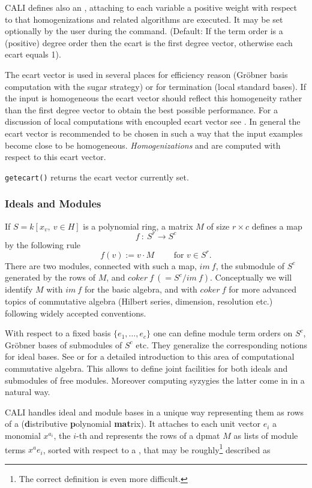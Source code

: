 CALI defines also an , attaching to each variable a
positive weight with respect to that homogenizations and related
algorithms are executed. It may be set optionally by the user during
the  command.  (Default: If the term order is a
(positive) degree order then the ecart is the first degree vector,
otherwise each ecart equals 1).

The ecart vector is used in several places for efficiency reason (Gr\"obner
basis computation with the sugar strategy) or for termination (local
standard bases). If the input is homogeneous the ecart vector should
reflect this homogeneity rather than the first degree vector to
obtain the best possible performance. For a discussion of local
computations with encoupled ecart vector see \cite{tcah}. In general
the ecart vector is recommended to be chosen in such a way that the
input examples become close to be homogeneous. \emph{Homogenizations}
and  are computed with respect to this ecart
vector.
\medskip

\noindent \verb|getecart()| returns the ecart vector
currently set.


\subsubsection{Ideals and Modules}

If $S=k[x_v,\ v \in H]$ is a polynomial ring, a matrix $M$ of size
$r\times c$ defines a map
\[f\ :\ S^r \longrightarrow S^c\]
by the following rule
\[ f(v):=v\cdot M \qquad \mbox{ for } v \in S^r.\]
There are two modules, connected with such a map, $im\ f$, the
submodule of $S^c$ generated by the rows of $M$, and $coker\ f\
(=S^c/im\ f)$. Conceptually we will identify $M$ with $im\ f$ for the
basic algebra, and with $coker\ f$ for more advanced topics of
commutative algebra (Hilbert series, dimension, resolution etc.)
following widely accepted conventions.

With respect to a fixed basis $\{e_1,\ldots ,e_c\}$ one can define
module term orders on $S^c$, Gr\"obner bases of submodules of $S^c$ etc.
They generalize the corresponding notions for ideal bases. See
\cite{E} or \cite{MM} for a detailed introduction to this area of
computational commutative algebra. This allows to define joint
facilities for both ideals and submodules of free modules. Moreover
computing syzygies the latter come in in a natural way.

CALI handles ideal and module bases in a unique way representing them
as rows of a \ind{dpmat} (\textbf{d}istributive \textbf{p}olynomial \textbf{mat}rix). 
It attaches to each unit vector $e_i$ a monomial $x^{a_i}$,
the $i$-th  and represents the rows of a dpmat $M$
as lists of module terms $x^ae_i$, sorted with respect to a
, that may be roughly\footnote{The correct
definition is even more difficult.} described as 
\bigskip

